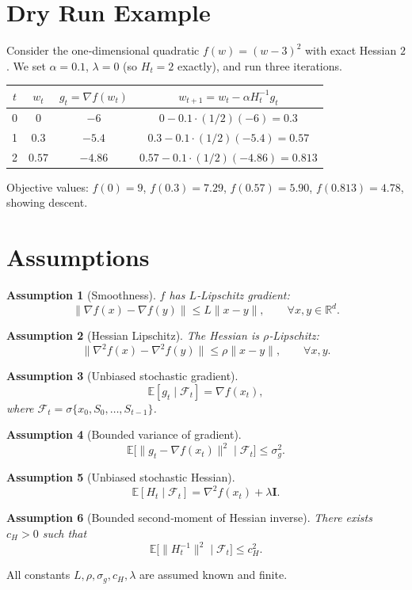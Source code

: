 \documentclass{article}
\newtheorem{assumption}{Assumption}
\newcommand{\E}{\mathbb{E}}
\newcommand{\Id}{\mathbf I}
\begin{document}
\section*{Dry Run Example}
Consider the one‑dimensional quadratic $f(w)=(w-3)^2$ with exact Hessian $2$.  
We set $\alpha=0.1$, $\lambda=0$ (so $H_t=2$ exactly), and run three iterations.

\begin{tabular}{c|c|c|c}
$t$ & $w_t$ & $g_t=\nabla f(w_t)$ & $w_{t+1}=w_t-\alpha H_t^{-1}g_t$ \\ \hline
0 & $0$ & $-6$ & $0-0.1\cdot(1/2)(-6)=0.3$ \\
1 & $0.3$ & $-5.4$ & $0.3-0.1\cdot(1/2)(-5.4)=0.57$ \\
2 & $0.57$ & $-4.86$ & $0.57-0.1\cdot(1/2)(-4.86)=0.813$ \\
\end{tabular}

Objective values: $f(0)=9$, $f(0.3)=7.29$, $f(0.57)=5.90$, $f(0.813)=4.78$, showing descent.

\section*{Assumptions}
\begin{assumption}[Smoothness]\label{as:smooth}
$f$ has $L$‑Lipschitz gradient:
\[
\|\nabla f(x)-\nabla f(y)\|\le L\|x-y\|,\qquad\forall x,y\in\mathbb{R}^d.
\]
\end{assumption}
\begin{assumption}[Hessian Lipschitz]\label{as:hessian}
The Hessian is $\rho$‑Lipschitz:
\[
\|\nabla^2 f(x)-\nabla^2 f(y)\|\le \rho\|x-y\|,\qquad\forall x,y.
\]
\end{assumption}
\begin{assumption}[Unbiased stochastic gradient]\label{as:grad-unbiased}
\[
\E[g_t\mid \mathcal{F}_t]=\nabla f(x_t),
\]
where $\mathcal{F}_t=\sigma\{x_0,S_0,\dots,S_{t-1}\}$.
\end{assumption}
\begin{assumption}[Bounded variance of gradient]\label{as:grad-var}
\[
\E\big[\|g_t-\nabla f(x_t)\|^2\mid\mathcal{F}_t\big]\le\sigma_g^2.
\]
\end{assumption}
\begin{assumption}[Unbiased stochastic Hessian]\label{as:hess-unbiased}
\[
\E[H_t\mid\mathcal{F}_t]=\nabla^2 f(x_t)+\lambda\Id.
\]
\end{assumption}
\begin{assumption}[Bounded second‑moment of Hessian inverse]\label{as:hess-inv}
There exists $c_H>0$ such that
\[
\E\big[\|H_t^{-1}\|^2\mid\mathcal{F}_t\big]\le c_H^2.
\]
\end{assumption}
All constants $L,\rho,\sigma_g,c_H,\lambda$ are assumed known and finite.
\end{document}
